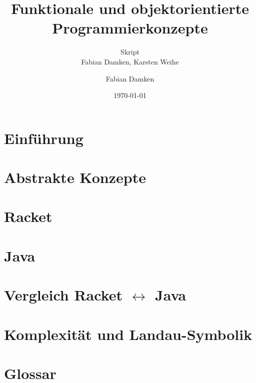 \documentclass[a4paper, 11pt, accentcolor = tud3b]{tudreport}
\title{Funktionale und objektorientierte Programmierkonzepte}
\subtitle{Skript \\ Fabian Damken, Karsten Weihe}
\author{Fabian Damken}
\date{\today}
\begin{document}
	

    \maketitle
    \tableofcontents
    \listoftodos

    \chapter{Einführung}
        

	\chapter{Abstrakte Konzepte}
		

    \chapter{Racket}
        

    \chapter{Java}
        
    
    \chapter{Vergleich Racket $ \leftrightarrow $ Java}
	    
    
    \chapter{Komplexität und Landau-Symbolik}
	    

    \chapter{Glossar}
    
    
\end{document}
